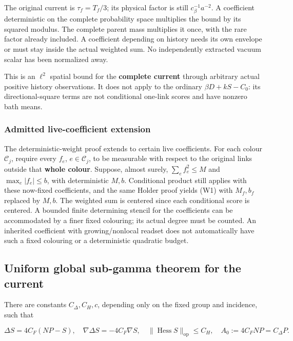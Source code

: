 \documentclass[
  11pt,
]{article}
\begin{document}
The original current is \(\tau_f=T_f/3\); its physical factor is still
\(c_\beta^{-1}a^{-2}\). A coefficient deterministic on the complete
probability space multiplies the bound by its squared modulus. The
complete parent mass multiplies it once, with the rare factor already
included. A coefficient depending on history needs its own envelope or
must stay inside the actual weighted sum. No independently extracted
vacuum scalar has been normalized away.

This is an \(\ell^2\) spatial bound for the \textbf{complete current}
through arbitrary actual positive history observations. It does not
apply to the ordinary \(\beta D+kS-C_0\): its directional-square terms
are not conditional one-link scores and have nonzero bath means.

\hypertarget{admitted-live-coefficient-extension}{%
\subsubsection{Admitted live-coefficient
extension}\label{admitted-live-coefficient-extension}}

The deterministic-weight proof extends to certain live coefficients. For
each colour \(\mathcal C_j\), require every \(f_e\),
\(e\in\mathcal C_j\), to be measurable with respect to the original
links outside that \textbf{whole colour}. Suppose, almost surely,
\(\sum_e f_e^2\le M\) and \(\max_e|f_e|\le b\), with deterministic
\(M,b\). Conditional product still applies with these now-fixed
coefficients, and the same Holder proof yields (W1) with \(M_f,b_f\)
replaced by \(M,b\). The weighted sum is centered since each conditional
score is centered. A bounded finite determining stencil for the
coefficients can be accommodated by a finer fixed colouring; its actual
degree must be counted. An inherited coefficient with growing/nonlocal
readset does not automatically have such a fixed colouring or a
deterministic quadratic budget.

\hypertarget{uniform-global-sub-gamma-theorem-for-the-current}{%
\subsection{Uniform global sub-gamma theorem for the
current}\label{uniform-global-sub-gamma-theorem-for-the-current}}

There are constants \(C_\Delta,C_H,c\), depending only on the fixed
group and incidence, such that

\[
 \Delta S=4C_F(NP-S),\quad \nabla\Delta S=-4C_F\nabla S,
 \quad \|\operatorname{Hess}S\|_{\mathrm{op}}\le C_H,
 \quad A_0:=4C_FNP=C_\Delta P.
\]
\end{document}

